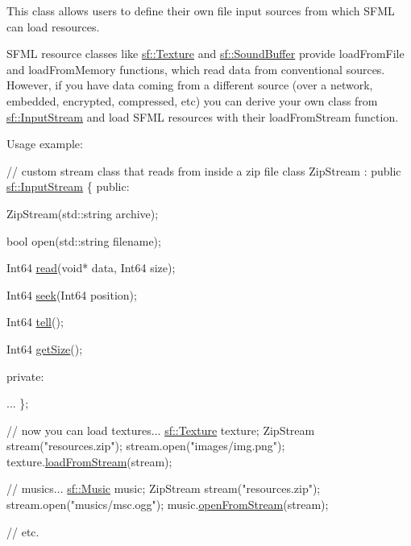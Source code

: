 This class allows users to define their own file input sources from which S\+F\+ML can load resources.

S\+F\+ML resource classes like \hyperlink{classsf_1_1_texture}{sf\+::\+Texture} and \hyperlink{classsf_1_1_sound_buffer}{sf\+::\+Sound\+Buffer} provide load\+From\+File and load\+From\+Memory functions, which read data from conventional sources. However, if you have data coming from a different source (over a network, embedded, encrypted, compressed, etc) you can derive your own class from \hyperlink{classsf_1_1_input_stream}{sf\+::\+Input\+Stream} and load S\+F\+ML resources with their load\+From\+Stream function.

Usage example\+: 
\begin{DoxyCode}
\textcolor{comment}{// custom stream class that reads from inside a zip file}
\textcolor{keyword}{class }ZipStream : \textcolor{keyword}{public} \hyperlink{classsf_1_1_input_stream}{sf::InputStream}
\{
\textcolor{keyword}{public}:

    ZipStream(std::string archive);

    \textcolor{keywordtype}{bool} open(std::string filename);

    Int64 \hyperlink{classsf_1_1_input_stream_a8dd89c74c1acb693203f50e750c6ae53}{read}(\textcolor{keywordtype}{void}* data, Int64 size);

    Int64 \hyperlink{classsf_1_1_input_stream_a76aba8e5d5cf9b1c5902d5e04f7864fc}{seek}(Int64 position);

    Int64 \hyperlink{classsf_1_1_input_stream_a599515b9ccdbddb6fef5a98424fd559c}{tell}();

    Int64 \hyperlink{classsf_1_1_input_stream_a311eaaaa65d636728e5153b574b72d5d}{getSize}();

\textcolor{keyword}{private}:

    ...
\};

\textcolor{comment}{// now you can load textures...}
\hyperlink{classsf_1_1_texture}{sf::Texture} texture;
ZipStream stream(\textcolor{stringliteral}{"resources.zip"});
stream.open(\textcolor{stringliteral}{"images/img.png"});
texture.\hyperlink{classsf_1_1_texture_a786b486a46b1c6d1c16ff4af61ecc601}{loadFromStream}(stream);

\textcolor{comment}{// musics...}
\hyperlink{classsf_1_1_music}{sf::Music} music;
ZipStream stream(\textcolor{stringliteral}{"resources.zip"});
stream.open(\textcolor{stringliteral}{"musics/msc.ogg"});
music.\hyperlink{classsf_1_1_music_a4e55d1910a26858b44778c26b237d673}{openFromStream}(stream);

\textcolor{comment}{// etc.}
\end{DoxyCode}
 

